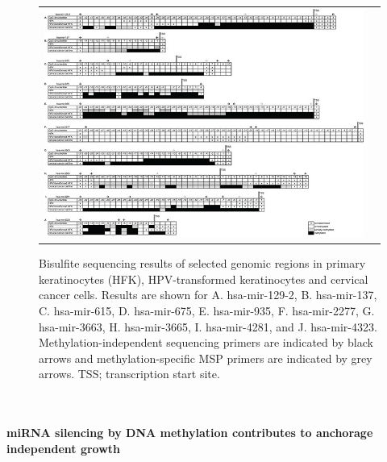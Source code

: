 \begin{figure}[h!]
\centering
\begin{tabular}{cc} 
\includegraphics[scale=3.2, angle =270]{Figure3.jpg}
\end{tabular}
\caption{Bisulfite sequencing results of selected genomic regions in primary keratinocytes (HFK), HPV-transformed keratinocytes and cervical cancer cells. Results are shown for A. hsa-mir-129-2, B. hsa-mir-137, C. hsa-mir-615, D. hsa-mir-675, E. hsa-mir-935, F. hsa-mir-2277, G. hsa-mir-3663, H. hsa-mir-3665, I. hsa-mir-4281, and J. hsa-mir-4323. Methylation-independent sequencing primers are indicated by black arrows and methylation-specific MSP primers are indicated by grey arrows. TSS; transcription start site.}
\label{fig:figure3}
\end{figure}
\\
\\
\textbf{miRNA silencing by DNA methylation contributes to anchorage independent growth}
\\
